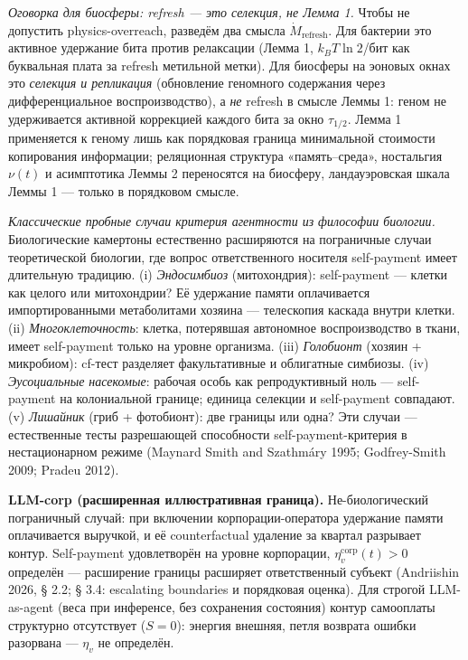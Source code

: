 \documentclass[pdflatex,sn-mathphys-ay]{sn-jnl}
\begin{document}
\emph{Оговорка для биосферы: refresh --- это селекция, не Лемма 1.} Чтобы не допустить physics-overreach, разведём два смысла \(\dot M_{\text{refresh}}\). Для бактерии это активное удержание бита против релаксации (Лемма 1, \(k_B T \ln 2\)/бит как буквальная плата за refresh метильной метки). Для биосферы на эоновых окнах это \emph{селекция и репликация} (обновление геномного содержания через дифференциальное воспроизводство), а \emph{не} refresh в смысле Леммы 1: геном не удерживается активной коррекцией каждого бита за окно \(\tau_{1/2}\). Лемма 1 применяется к геному лишь как порядковая граница минимальной стоимости копирования информации; реляционная структура «память--среда», ностальгия \(\nu(t)\) и асимптотика Леммы 2 переносятся на биосферу, ландауэровская шкала Леммы 1 --- только в порядковом смысле.



\emph{Классические пробные случаи критерия агентности из философии биологии.} Биологические камертоны естественно расширяются на пограничные случаи теоретической биологии, где вопрос ответственного носителя self-payment имеет длительную традицию. (i) \emph{Эндосимбиоз} (митохондрия): self-payment --- клетки как целого или митохондрии? Её удержание памяти оплачивается импортированными метаболитами хозяина --- телескопия каскада внутри клетки. (ii) \emph{Многоклеточность}: клетка, потерявшая автономное воспроизводство в ткани, имеет self-payment только на уровне организма. (iii) \emph{Голобионт} (хозяин + микробиом): cf-тест разделяет факультативные и облигатные симбиозы. (iv) \emph{Эусоциальные насекомые}: рабочая особь как репродуктивный ноль --- self-payment на колониальной границе; единица селекции и self-payment совпадают. (v) \emph{Лишайник} (гриб + фотобионт): две границы или одна? Эти случаи --- естественные тесты разрешающей способности self-payment-критерия в нестационарном режиме (Maynard Smith and Szathmáry 1995; Godfrey-Smith 2009; Pradeu 2012).



\textbf{LLM-corp (расширенная иллюстративная граница).} Не-биологический пограничный случай: при включении корпорации-оператора удержание памяти оплачивается выручкой, и её counterfactual удаление за квартал разрывает контур. Self-payment удовлетворён на уровне корпорации, \(\eta_v^{\text{corp}}(t) > 0\) определён --- расширение границы расширяет ответственный субъект (Andriishin 2026, § 2.2; § 3.4: escalating boundaries и порядковая оценка). Для строгой LLM-as-agent (веса при инференсе, без сохранения состояния) контур самооплаты структурно отсутствует (\(S = 0\)): энергия внешняя, петля возврата ошибки разорвана --- \(\eta_v\) не определён.
\end{document}

